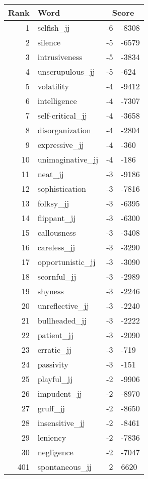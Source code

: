 \begin{longtable}[!htbp]{| rlr@{.}l |}
    \hline
    \textbf{Rank} & \textbf{Word} & \multicolumn{2}{c|}{\textbf{Score}} \\
    \hline
    \endhead
    1 & selfish\_jj & -6 & -8308 \\
    2 & silence & -5 & -6579 \\
    3 & intrusiveness & -5 & -3834 \\
    4 & unscrupulous\_jj & -5 & -624 \\
    5 & volatility & -4 & -9412 \\
    6 & intelligence & -4 & -7307 \\
    7 & self-critical\_jj & -4 & -3658 \\
    8 & disorganization & -4 & -2804 \\
    9 & expressive\_jj & -4 & -360 \\
    10 & unimaginative\_jj & -4 & -186 \\
    11 & neat\_jj & -3 & -9186 \\
    12 & sophistication & -3 & -7816 \\
    13 & folksy\_jj & -3 & -6395 \\
    14 & flippant\_jj & -3 & -6300 \\
    15 & callousness & -3 & -3408 \\
    16 & careless\_jj & -3 & -3290 \\
    17 & opportunistic\_jj & -3 & -3090 \\
    18 & scornful\_jj & -3 & -2989 \\
    19 & shyness & -3 & -2246 \\
    20 & unreflective\_jj & -3 & -2240 \\
    21 & bullheaded\_jj & -3 & -2222 \\
    22 & patient\_jj & -3 & -2090 \\
    23 & erratic\_jj & -3 & -719 \\
    24 & passivity & -3 & -151 \\
    25 & playful\_jj & -2 & -9906 \\
    26 & impudent\_jj & -2 & -8970 \\
    27 & gruff\_jj & -2 & -8650 \\
    28 & insensitive\_jj & -2 & -8461 \\
    29 & leniency & -2 & -7836 \\
    30 & negligence & -2 & -7047 \\
    401 & spontaneous\_jj & 2 & 6620 \\

\end{longtable}
